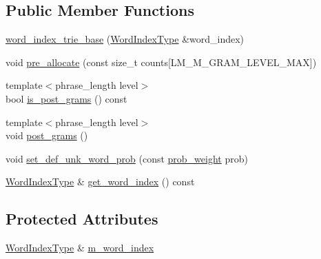 \subsection*{Public Member Functions}
\begin{DoxyCompactItemize}
\item 
\hyperlink{classuva_1_1smt_1_1bpbd_1_1server_1_1lm_1_1word__index__trie__base_a7b7f68670ef02b7359b6a1a68ed6b437}{word\+\_\+index\+\_\+trie\+\_\+base} (\hyperlink{classuva_1_1smt_1_1bpbd_1_1server_1_1lm_1_1word__index__trie__base_a64279b5b94c421b25aedaa72e73d013c}{Word\+Index\+Type} \&word\+\_\+index)
\item 
void \hyperlink{classuva_1_1smt_1_1bpbd_1_1server_1_1lm_1_1word__index__trie__base_a89b512858b316ca97e6d6e8a8a20e66c}{pre\+\_\+allocate} (const size\+\_\+t counts\mbox{[}L\+M\+\_\+\+M\+\_\+\+G\+R\+A\+M\+\_\+\+L\+E\+V\+E\+L\+\_\+\+M\+A\+X\mbox{]})
\item 
{\footnotesize template$<$phrase\+\_\+length level$>$ }\\bool \hyperlink{classuva_1_1smt_1_1bpbd_1_1server_1_1lm_1_1word__index__trie__base_a22422f99173ffc55dd4783f93e4a1947}{is\+\_\+post\+\_\+grams} () const 
\item 
{\footnotesize template$<$phrase\+\_\+length level$>$ }\\void \hyperlink{classuva_1_1smt_1_1bpbd_1_1server_1_1lm_1_1word__index__trie__base_aecd81ef42eac4dd636d1dcbec2d25799}{post\+\_\+grams} ()
\item 
void \hyperlink{classuva_1_1smt_1_1bpbd_1_1server_1_1lm_1_1word__index__trie__base_aff0ddb33d597ce59392cc93bf267c34a}{set\+\_\+def\+\_\+unk\+\_\+word\+\_\+prob} (const \hyperlink{namespaceuva_1_1smt_1_1bpbd_1_1server_a01e9ea4de9c226f4464862e84ff0bbcc}{prob\+\_\+weight} prob)
\item 
\hyperlink{classuva_1_1smt_1_1bpbd_1_1server_1_1lm_1_1word__index__trie__base_a64279b5b94c421b25aedaa72e73d013c}{Word\+Index\+Type} \& \hyperlink{classuva_1_1smt_1_1bpbd_1_1server_1_1lm_1_1word__index__trie__base_a3b62d7a65ce987fa1ba6dd493ffb06e7}{get\+\_\+word\+\_\+index} () const 
\end{DoxyCompactItemize}
\subsection*{Protected Attributes}
\begin{DoxyCompactItemize}
\item 
\hyperlink{classuva_1_1smt_1_1bpbd_1_1server_1_1lm_1_1word__index__trie__base_a64279b5b94c421b25aedaa72e73d013c}{Word\+Index\+Type} \& \hyperlink{classuva_1_1smt_1_1bpbd_1_1server_1_1lm_1_1word__index__trie__base_a14800ace951997474c3a562405b9482e}{m\+\_\+word\+\_\+index}
\end{DoxyCompactItemize}


